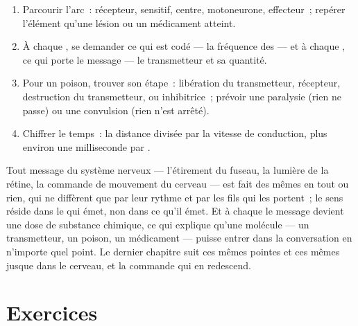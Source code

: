 \begin{method}\label{met:g12:stretch-reflex:analyse}
\begin{enumerate}
  \item Parcourir l'arc~: récepteur,  sensitif, centre,
        motoneurone, effecteur~; repérer l'élément qu'une lésion ou un
        médicament atteint.
  \item À chaque , se demander ce qui est codé --- la fréquence
        des  --- et à chaque , ce qui porte
        le message --- le transmetteur et sa quantité.
  \item Pour un poison, trouver son étape~: libération du
        transmetteur, récepteur, destruction du transmetteur, ou
         inhibitrice~; prévoir une paralysie (rien ne passe) ou
        une convulsion (rien n'est arrêté).
  \item Chiffrer le temps~: la distance divisée par la vitesse de
        conduction, plus environ une milliseconde par .
\end{enumerate}
\end{method}

\begin{remark}\label{rem:g12:stretch-reflex:spikes}
Tout message du système nerveux --- l'étirement du fuseau, la lumière
de la rétine, la commande de mouvement du cerveau --- est fait des
mêmes  en tout ou rien, qui ne diffèrent que par
leur rythme et par les fils qui les portent~; le sens réside dans le
 qui émet, non dans ce qu'il émet. Et à chaque  le
message devient une dose de substance chimique, ce qui explique qu'une
molécule --- un transmetteur, un poison, un médicament --- puisse
entrer dans la conversation en n'importe quel point. Le dernier
chapitre suit ces mêmes pointes et ces mêmes  jusque dans le
cerveau, et la commande qui en redescend.
\end{remark}

\section{Exercices}

